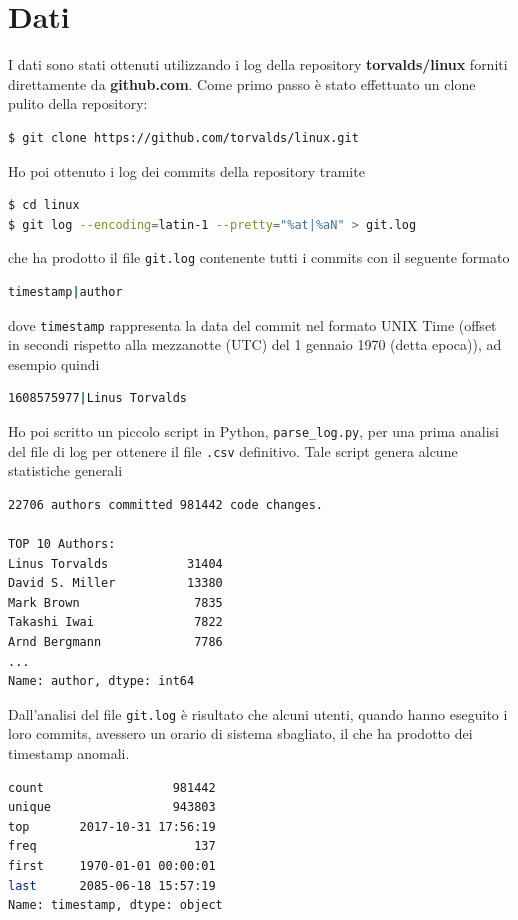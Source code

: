 \documentclass[11pt,a4paper]{article}
\begin{document}
\section{Dati}
I dati sono stati ottenuti utilizzando i log della repository
\textbf{torvalds/linux} forniti direttamente da \textbf{github.com}. Come primo
passo \`e stato effettuato un clone pulito della repository:
\begin{lstlisting}[language=bash,basicstyle=\scriptsize,tabsize=2,frame = single]
$ git clone https://github.com/torvalds/linux.git
\end{lstlisting}
Ho poi ottenuto i log dei commits della repository tramite
\begin{lstlisting}[language=bash,basicstyle=\scriptsize,tabsize=2,frame = single]
$ cd linux
$ git log --encoding=latin-1 --pretty="%at|%aN" > git.log
\end{lstlisting}
che ha prodotto il file \texttt{git.log} contenente tutti i commits con il
seguente formato
\begin{lstlisting}[language=bash,basicstyle=\scriptsize,tabsize=2,frame = single]
timestamp|author
\end{lstlisting}
dove \texttt{timestamp} rappresenta la data del commit nel formato UNIX Time
(offset in secondi rispetto alla mezzanotte (UTC) del 1 gennaio 1970 (detta
epoca)), ad esempio quindi
\begin{lstlisting}[language=bash,basicstyle=\scriptsize,tabsize=2,frame = single]
1608575977|Linus Torvalds
\end{lstlisting}
Ho poi scritto un piccolo script in Python, \texttt{parse\_log.py}, per una prima
analisi del file di log per ottenere il file \texttt{.csv} definitivo. Tale
script genera alcune statistiche generali
\begin{lstlisting}[language=bash,basicstyle=\scriptsize,tabsize=2,frame = single]
22706 authors committed 981442 code changes.

TOP 10 Authors:
Linus Torvalds           31404
David S. Miller          13380
Mark Brown                7835
Takashi Iwai              7822
Arnd Bergmann             7786
...
Name: author, dtype: int64
\end{lstlisting}
Dall'analisi del file \texttt{git.log} \`e risultato che alcuni utenti, quando
hanno eseguito i loro commits, avessero un orario di sistema sbagliato, il che
ha prodotto dei timestamp anomali.
\begin{lstlisting}[language=bash,basicstyle=\scriptsize,tabsize=2,frame = single]
count                  981442
unique                 943803
top       2017-10-31 17:56:19
freq                      137
first     1970-01-01 00:00:01
last      2085-06-18 15:57:19
Name: timestamp, dtype: object
\end{lstlisting}
\end{document}
